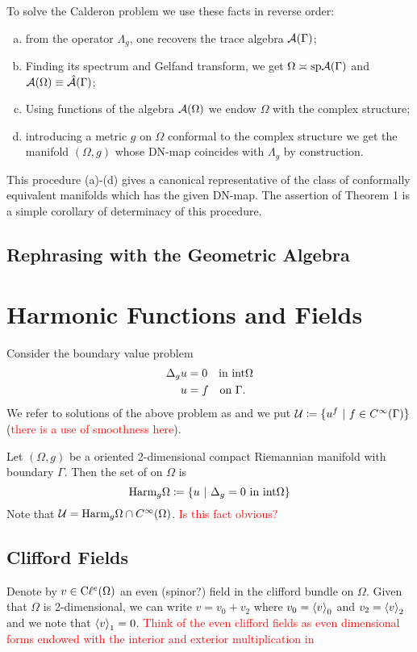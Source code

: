 To solve the Calderon problem we use these facts in reverse order:
\begin{enumerate}[(a)]
	\item from the operator $\Lambda_g$, one recovers the trace algebra $\mathcal{A}(\Gamma)$;
	\item Finding its spectrum and Gelfand transform, we get $\Omega \asymp \mathrm{sp} \mathcal{A}(\Gamma)$ and $\mathcal{A}(\Omega)\equiv \hat{\mathcal{A}}(\Gamma)$;
	\item Using functions of the algebra $\mathcal{A}(\Omega)$ we endow $\Omega$ with the complex structure;
	\item introducing a metric $g$ on $\Omega$ conformal to the complex structure we get the manifold $(\Omega,g)$ whose DN-map coincides with $\Lambda_g$ by construction.
\end{enumerate}
This procedure (a)-(d) gives a canonical representative of the class of conformally equivalent manifolds which has the given DN-map. The assertion of Theorem 1 is a simple corollary of determinacy of this procedure.

\subsection{Rephrasing with the Geometric Algebra}

\section{Harmonic Functions and Fields}
Consider the boundary value problem
\begin{align}
	\Delta_g u &= 0 \quad \textrm{in $\mathrm{int} \Omega$}\\
	u&=f \quad \textrm{on $\Gamma$}.
\end{align}
We refer to solutions of the above problem as  and we put $\mathcal{U} \coloneqq \{u^f~\vert~f\in C^\infty(\Gamma)\}$ (\textcolor{red}{there is a use of smoothness here}).

Let $(\Omega,g)$ be a oriented 2-dimensional compact Riemannian manifold with boundary $\Gamma$. Then the set of  on $\Omega$ is
  \[
  \mathrm{Harm}_g \Omega \coloneqq \{u~\vert~\Delta_g=0 ~\textrm{in}~\mathrm{int} \Omega\}
  \]
  Note that $\mathcal{U} = \mathrm{Harm}_g \Omega \cap C^\infty (\Omega)$. \textcolor{red}{Is this fact obvious?}
    
  \subsection{Clifford Fields}
  Denote by $v\in \mathrm{C}\ell^e(\Omega)$ an even (spinor?) field in the clifford bundle on $\Omega$.  Given that $\Omega$ is 2-dimensional, we can write $v=v_0+v_2$ where $v_0=\left\langle v\right\rangle_0$ and $v_2=\left\langle v\right\rangle_2$ and we note that $\left\langle v\right\rangle_1=0$. \textcolor{red}{Think of the even clifford fields as even dimensional forms endowed with the interior and exterior multiplication in \cite{dirac-spectral}}
    
